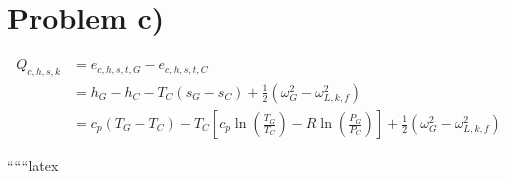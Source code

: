 \section*{Problem c)}

\begin{align*}
Q_{c,h,s,k} &= e_{c,h,s,t,G} - e_{c,h,s,t,C} \\
&= h_G - h_C - T_C(s_G - s_C) + \frac{1}{2} \left( \omega_G^2 - \omega_{L,k,f}^2 \right) \\
&= c_p (T_G - T_C) - T_C \left[ c_p \ln \left( \frac{T_G}{T_C} \right) - R \ln \left( \frac{P_G}{P_C} \right) \right] + \frac{1}{2} \left( \omega_G^2 - \omega_{L,k,f}^2 \right)
\end{align*}

``````latex